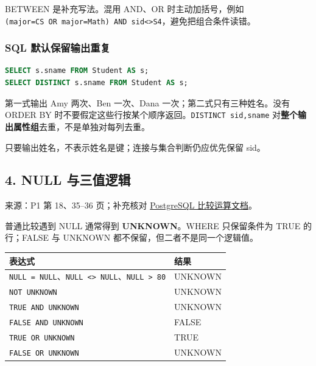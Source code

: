 BETWEEN 是补充写法。混用 AND、OR 时主动加括号，例如 \texttt{(major=\textquotesingle{}CS\textquotesingle{}\ OR\ major=\textquotesingle{}Math\textquotesingle{})\ AND\ sid\textless{}\textgreater{}\textquotesingle{}S4\textquotesingle{}}，避免把组合条件读错。

\subsubsection{SQL 默认保留输出重复}\label{06_sql_queries_zh-sql-ux9ed8ux8ba4ux4fddux7559ux8f93ux51faux91cdux590d}

\Needspace{60pt}
\begin{lstlisting}[language=SQL]
SELECT s.sname FROM Student AS s;
SELECT DISTINCT s.sname FROM Student AS s;
\end{lstlisting}

第一式输出 Amy 两次、Ben 一次、Dana 一次；第二式只有三种姓名。没有 ORDER BY 时不要假定这些行按某个顺序返回。\texttt{DISTINCT\ sid,\allowbreak{}sname} 对\textbf{整个输出属性组}去重，不是单独对每列去重。

只要输出姓名，不表示姓名是键；连接与集合判断仍应优先保留 sid。

\Needspace{11cm}
\subsection{4. NULL 与三值逻辑}\label{06_sql_queries_zh-null-ux4e0eux4e09ux503cux903bux8f91}


来源：P1 第 18、35--36 页；补充核对 \href{https://www.postgresql.org/docs/18/functions-comparison.html}{PostgreSQL 比较运算文档}。

普通比较遇到 NULL 通常得到 \textbf{UNKNOWN}。WHERE 只保留条件为 TRUE 的行；FALSE 与 UNKNOWN 都不保留，但二者不是同一个逻辑值。

\begin{longtable}[]{@{}ll@{}}
\toprule\noalign{}
表达式 & 结果 \\
\midrule\noalign{}
\endhead
\bottomrule\noalign{}
\endlastfoot
\texttt{NULL\ =\ NULL}、\texttt{NULL\ \textless{}\textgreater{}\ NULL}、\texttt{NULL\ \textgreater{}\ 80} & UNKNOWN \\
\texttt{NOT\ UNKNOWN} & UNKNOWN \\
\texttt{TRUE\ AND\ UNKNOWN} & UNKNOWN \\
\texttt{FALSE\ AND\ UNKNOWN} & FALSE \\
\texttt{TRUE\ OR\ UNKNOWN} & TRUE \\
\texttt{FALSE\ OR\ UNKNOWN} & UNKNOWN \\
\end{longtable}

